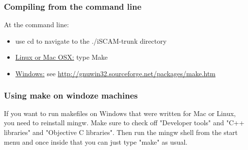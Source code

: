 \begin{frame}
	\frametitle{Compiling from the command line}
	At the command line:
	\begin{itemize}[<+->]
		\item use cd to navigate to the ./iSCAM-trunk directory
		\item \underline{Linux or Mac OSX:} type Make
		\item \underline{Windows:} see \url{http://gnuwin32.sourceforge.net/packages/make.htm}
	\end{itemize}
	
\end{frame}

\begin{frame}
	\frametitle{Using make on windoze machines}
	If you want to run makefiles on Windows that were written for Mac or Linux, you need to reinstall mingw.  Make sure to check off "Developer tools" and "C++ libraries" and "Objective C libraries".  Then run the mingw shell from the start menu and once inside that you can just type "make" as usual.
\end{frame}



